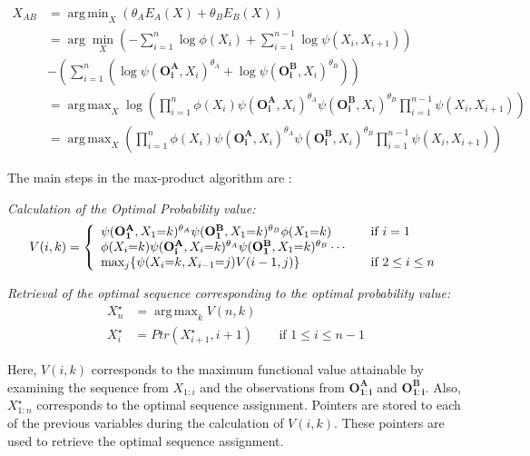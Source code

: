 \documentclass{article}
\DeclareMathOperator*{\argmax}{arg\,max}
\DeclareMathOperator*{\argmin}{arg\,min}
\begin{document}
\begin{align*}
X_{AB} &= \argmin_X \left( \theta_A E_A(X) + \theta_B E_B(X)\right) \\
&= \arg \min_X \left( -\sum_{i=1}^{n}{\log\phi(X_i)} + \sum_{i=1}^{n-1}{\log\psi(X_i,X_{i+1})}\right)\\ 
 &-\left( \sum_{i=1}^{n}{(\log\psi(\mathbf{O^A_i},X_i)^{\theta_A} + \log\psi(\mathbf{O^B_i},X_i)^{\theta_B})} \right) \\
 &= \argmax_{X}\log\left( \prod_{i=1}^{n}{\phi(X_i)\psi(\mathbf{O^A_i},X_i)^{\theta_A} \psi(\mathbf{O^B_i},X_i)^{\theta_B}}\prod_{i=1}^{n-1}{\psi(X_i,X_{i+1})}\right) \\
 &= \argmax_{X}\left( \prod_{i=1}^{n}{\phi(X_i)\psi(\mathbf{O^A_i},X_i)^{\theta_A} \psi(\mathbf{O^B_i},X_i)^{\theta_B}}\prod_{i=1}^{n-1}{\psi(X_i,X_{i+1})}\right)
\end{align*}

 The main steps in the max-product algorithm are : 

\vspace*{0.2in}

\textit{Calculation of the Optimal Probability value:}
\[
  V(i,k) = \left\{
  \begin{array}{l l}
    \psi(\mathbf{O^A_1},X_1{=}k)^{\theta_A}\psi(\mathbf{O^B_1},X_1{=}k)^{\theta_B}\phi(X_1{=}k) & \quad \text{if $i=1$}\\
    \phi(X_i{=}k)\psi(\mathbf{O^A_i},X_i{=}k)^{\theta_A}\psi(\mathbf{O^B_1},X_1{=}k)^{\theta_B}\cdots\\
    \max_{j}\{\psi(X_{i}{=}k,X_{i-1}{=}j)V(i-1,j)\} & \quad \text{if $2\leq i\leq n$}\\
  \end{array} \right.
\]


\textit{Retrieval of the optimal sequence corresponding to the optimal probability value:}
\begin{align*}
X^\star_n &= \argmax_{k}V(n,k) \\
X^\star_{i} &= Ptr(X^\star_{i+1},i+1) & \quad \text{if $1\leq i \leq n-1 $}
\end{align*}

Here, $V(i,k)$ corresponds to the maximum functional value attainable by examining the sequence from $X_{1:i}$ and the observations from $\mathbf{O^A_{1:i}}$ and $\mathbf{O^B_{1:i}}$. Also, $X^\star_{1:n}$ corresponds to the optimal sequence assignment. Pointers are stored to each of the previous variables during the calculation of $V(i,k)$. These pointers are used to retrieve the optimal sequence assignment. 
\end{document}
